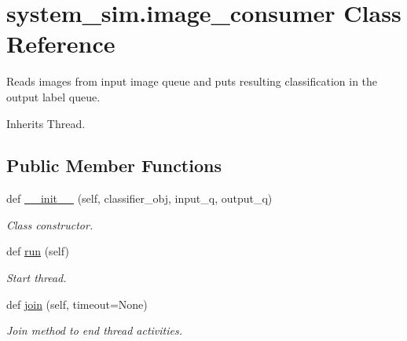 \hypertarget{classsystem__sim_1_1image__consumer}{}\section{system\+\_\+sim.\+image\+\_\+consumer Class Reference}
\label{classsystem__sim_1_1image__consumer}


Reads images from input image queue and puts resulting classification in the output label queue.  




Inherits Thread.

\subsection*{Public Member Functions}
\begin{DoxyCompactItemize}
\item 
def \mbox{\hyperlink{classsystem__sim_1_1image__consumer_a525e8c9e9b3f00bb4fd4ad66389bebc4}{\+\_\+\+\_\+init\+\_\+\+\_\+}} (self, classifier\+\_\+obj, input\+\_\+q, output\+\_\+q)
\begin{DoxyCompactList}\small\item\em Class constructor. \end{DoxyCompactList}\item 
\mbox{\label{classsystem__sim_1_1image__consumer_a7a3db58321c0b528453d50a8695eccf9}} 
def \mbox{\hyperlink{classsystem__sim_1_1image__consumer_a7a3db58321c0b528453d50a8695eccf9}{run}} (self)
\begin{DoxyCompactList}\small\item\em Start thread. \end{DoxyCompactList}\item 
\mbox{\label{classsystem__sim_1_1image__consumer_a6d10a70f5156b5b99844dbea0d879ebd}} 
def \mbox{\hyperlink{classsystem__sim_1_1image__consumer_a6d10a70f5156b5b99844dbea0d879ebd}{join}} (self, timeout=None)
\begin{DoxyCompactList}\small\item\em Join method to end thread activities. \end{DoxyCompactList}\end{DoxyCompactItemize}
